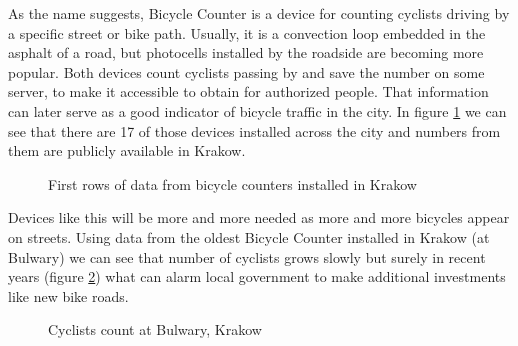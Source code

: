 As the name suggests, Bicycle Counter is a device for counting cyclists driving by a specific street or bike path. Usually, it is a convection loop embedded in the asphalt of a road, but photocells installed by the roadside are becoming more popular. Both devices count cyclists passing by and save the number on some server, to make it accessible to obtain for authorized people. That information can later serve as a good indicator of bicycle traffic in the city. In figure \ref{fig:countersKrakow} we can see that there are 17 of those devices installed across the city and numbers from them are publicly available in Krakow.
\begin{figure}[H]
    \centering
    \caption{First rows of data from bicycle counters installed in Krakow \cite{mobilnykrakow}}
    \label{fig:countersKrakow}
\end{figure}
Devices like this will be more and more needed as more and more bicycles appear on streets. Using data from the oldest Bicycle Counter installed in Krakow (at Bulwary)\cite{liczniki} we can see that number of cyclists grows slowly but surely in recent years (figure \ref{fig:graph3}) what can alarm local government to make additional investments like new bike roads.
\begin{figure}[H]
    \centering
    \caption{Cyclists count at Bulwary, Krakow}
    \label{fig:graph3}
\end{figure}
